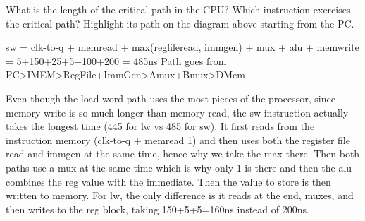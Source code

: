 \begin{blocksection}
\question
What is the length of the critical path in the CPU? Which instruction exercises the critical path?  Highlight its path on the diagram above starting from the PC.




\begin{solution}[0.5in]
sw = clk-to-q + memread + max(regfileread, immgen) + mux + alu + memwrite \\
= 5+150+25+5+100+200 = 485ns
Path goes from PC>IMEM>RegFile+ImmGen>Amux+Bmux>DMem

Even though the load word path uses the most pieces of the processor, since memory write is so much longer than memory read, the sw instruction actually takes the longest time (445 for lw vs 485 for sw).  It first reads from the instruction memory (clk-to-q + memread 1) and then uses both the register file read and immgen at the same time, hence why we take the max there.  Then both paths use a mux at the same time which is why only 1 is there and then the alu combines the reg value with the immediate.  Then the value to store is then written to memory.  For lw, the only difference is it reads at the end, muxes, and then writes to the reg block, taking 150+5+5=160ns instead of 200ns.

\end{solution}

\end{blocksection}

